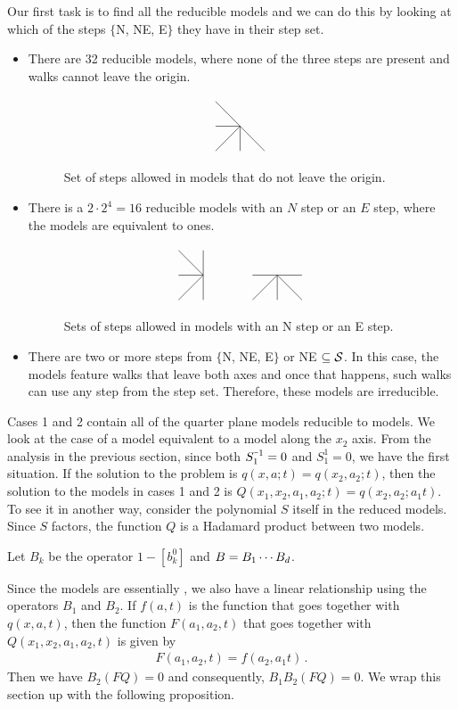 Our first task is to find all the reducible models and we can do this by looking at which of the steps $\{$N, NE, E$\}$ they have in their step set.

\begin{itemize}
	\item[1.] There are 32 reducible models, where none of the three steps are present and walks cannot leave the origin.
	\begin{figure}[H]
		\centering
		\[
			\modelgraphB 10010111
		\]
		\caption{Set of steps allowed in models that do not leave the origin.}
	\end{figure}
	\item[2.] There is a $2\cdot 2^4 = 16$ reducible models with an $N$ step or an $E$ step, where the models are equivalent to \oneD ones.
	\begin{figure}[H]
		\centering
		\[
			\modelgraphB 11010110 \quad \modelgraphB 00011111
		\]
		\caption{Sets of steps allowed in models with an N step or an E step.}
	\end{figure}
	\item[3.] There are two or more steps from $\{$N, NE, E$\}$ or NE $\subseteq \mathcal{S}$. In this case, the models feature walks that leave both axes and once that happens, such walks can use any step from the step set. Therefore, these models are irreducible.
 \end{itemize}

Cases 1 and 2 contain all of the quarter plane models reducible to \oneD models. We look at the case of a model equivalent to a \oneD model along the $x_2$ axis. From the analysis in the previous section, since both $S_1^{\um 1} = 0$ and $S_1^1 = 0$, we have the first situation. If the solution to the \oneD problem is $q(x,a;t) = q(x_2,a_2;t)$, then the solution to the models in cases 1 and 2 is $Q(x_1,x_2,a_1,a_2;t) = q(x_2,a_2;a_1t)$. To see it in another way, consider the polynomial $S$ itself in the reduced models. Since $S$ factors, the function $Q$ is a Hadamard product between two \oneD models.

\begin{defn} Let $B_k$ be the operator $1 - [b_k^0]$ and $B = B_1\cdots B_d$.
\end{defn}
Since the models are essentially \oneD, we also have a linear relationship using the operators $B_1$ and $B_2$. If $f(a,t)$ is the function that goes together with $q(x,a,t)$, then the function $F(a_1,a_2,t)$ that goes together with $Q(x_1,x_2,a_1,a_2,t)$ is given by
\begin{align}
	F(a_1,a_2,t) = f(a_2,a_1 t)\,.
\end{align}
Then we have $B_2 (F Q) = 0$ and consequently, $B_1B_2(F Q) = 0$. We wrap this section up with the following proposition.

